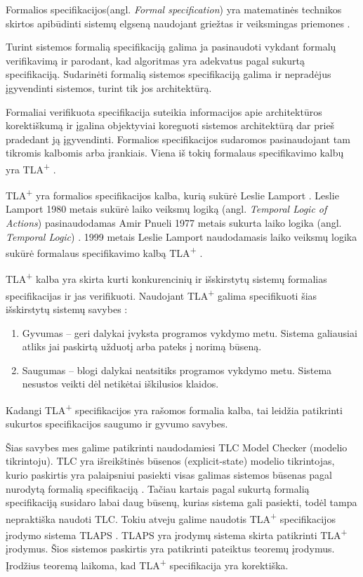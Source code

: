 \documentclass{VUMIFPSmagistrinis}
\begin{document}
        Formalios specifikacijos(angl. {\it Formal specification}) yra matematinės technikos skirtos apibūdinti sistemų elgseną naudojant griežtas ir veiksmingas priemones \cite{holzmann1995improvement}.
        
		Turint sistemos formalią specifikaciją galima ja pasinaudoti vykdant formalų verifikavimą ir parodant, kad algoritmas yra adekvatus pagal sukurtą specifikaciją.
		Sudarinėti formalią sistemos specifikaciją galima ir nepradėjus įgyvendinti sistemos, turint tik jos architektūrą. 
  
		Formaliai verifikuota specifikacija suteikia informacijos apie architektūros korektiškumą ir įgalina objektyviai koreguoti sistemos architektūrą dar prieš pradedant ją įgyvendinti.
		Formalios specifikacijos sudaromos pasinaudojant tam tikromis kalbomis arba įrankiais.
		Viena iš tokių formalaus specifikavimo kalbų yra TLA\textsuperscript{+} \cite{lamport2002specifying}.
		

		TLA\textsuperscript{+} yra formalios specifikacijos kalba, kurią sukūrė Leslie Lamport \cite{lamport2002specifying}.
		Leslie Lamport 1980 metais sukūrė laiko veiksmų logiką (angl. {\it Temporal Logic of Actions}) \cite{10.1145/177492.177726} pasinaudodamas Amir Pnueli 1977 metais sukurta laiko logika (angl. {\it Temporal Logic}) \cite{4567924}.
		1999 metais Leslie Lamport naudodamasis laiko veiksmų logika sukūrė formalaus specifikavimo kalbą TLA\textsuperscript{+} \cite{lamport2002specifying}.
		

        TLA\textsuperscript{+} kalba yra skirta kurti konkurencinių ir išskirstytų sistemų formalias specifikacijas ir jas verifikuoti.
		Naudojant TLA\textsuperscript{+} galima specifikuoti šias išskirstytų sistemų savybes \cite{lamport2019safety}:
  
		\begin{enumerate}
			\item{Gyvumas -- geri dalykai įvyksta programos vykdymo metu. Sistema galiausiai atliks jai paskirtą užduotį arba pateks į norimą būseną.}
			\item{Saugumas -- blogi dalykai neatsitiks programos vykdymo metu. Sistema nesustos veikti dėl netikėtai iškilusios klaidos.}
		\end{enumerate}
  
		Kadangi TLA\textsuperscript{+} specifikacijos yra rašomos formalia kalba, tai leidžia patikrinti sukurtos specifikacijos saugumo ir gyvumo savybes.

	Šias savybes mes galime patikrinti naudodamiesi TLC Model Checker (modelio tikrintoju).
		TLC yra išreikštinės būsenos (explicit-state) modelio tikrintojas, kurio paskirtis yra palaipsniui pasiekti visas galimas sistemos būsenas pagal nurodytą formalią specifikaciją \cite{yu1999model}.
		Tačiau kartais pagal sukurtą formalią specifikaciją susidaro labai daug būsenų, kurias sistema gali pasiekti, todėl tampa nepraktiška naudoti TLC.
		Tokiu atveju galime naudotis TLA\textsuperscript{+} specifikacijos įrodymo sistema TLAPS \cite{cousineau2012tla+}.
		TLAPS yra įrodymų sistema skirta patikrinti TLA\textsuperscript{+} įrodymus.
		Šios sistemos paskirtis yra patikrinti pateiktus teoremų įrodymus.
		Įrodžius teoremą laikoma, kad TLA\textsuperscript{+} specifikacija yra korektiška.
\end{document}
